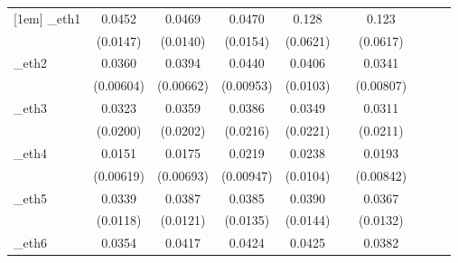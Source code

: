 \begin{table}[htbp]
\begin{tabular}{l*{9}{c}}
[1em]
\_eth1       &      0.0452\sym{***}&      0.0469\sym{***}&      0.0470\sym{***}&       0.128\sym{**} &                     &       0.123\sym{**} &                     &                     &                     \\
            &    (0.0147)         &    (0.0140)         &    (0.0154)         &    (0.0621)         &                     &    (0.0617)         &                     &                     &                     \\
[1em]
\_eth2       &      0.0360\sym{***}&      0.0394\sym{***}&      0.0440\sym{***}&      0.0406\sym{***}&                     &      0.0341\sym{***}&                     &                     &                     \\
            &   (0.00604)         &   (0.00662)         &   (0.00953)         &    (0.0103)         &                     &   (0.00807)         &                     &                     &                     \\
[1em]
\_eth3       &      0.0323         &      0.0359\sym{*}  &      0.0386\sym{*}  &      0.0349         &                     &      0.0311         &                     &                     &                     \\
            &    (0.0200)         &    (0.0202)         &    (0.0216)         &    (0.0221)         &                     &    (0.0211)         &                     &                     &                     \\
[1em]
\_eth4       &      0.0151\sym{**} &      0.0175\sym{**} &      0.0219\sym{**} &      0.0238\sym{**} &                     &      0.0193\sym{**} &                     &                     &                     \\
            &   (0.00619)         &   (0.00693)         &   (0.00947)         &    (0.0104)         &                     &   (0.00842)         &                     &                     &                     \\
[1em]
\_eth5       &      0.0339\sym{***}&      0.0387\sym{***}&      0.0385\sym{***}&      0.0390\sym{***}&                     &      0.0367\sym{***}&                     &                     &                     \\
            &    (0.0118)         &    (0.0121)         &    (0.0135)         &    (0.0144)         &                     &    (0.0132)         &                     &                     &                     \\
[1em]
\_eth6       &      0.0354\sym{*}  &      0.0417\sym{**} &      0.0424\sym{**} &      0.0425\sym{**} &                     &      0.0382\sym{**} &                     &                     &                     \\

\end{tabular}
\end{table}

